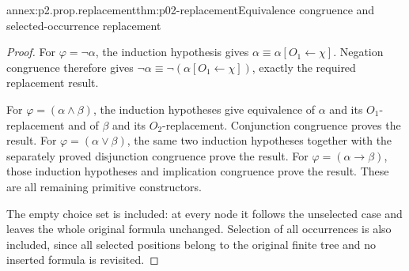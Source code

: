 \begin{annexitem}{annex:p2.prop.replacement}{thm:p02-replacement}{Equivalence congruence and selected-occurrence replacement}
\begin{proof}
For \(\varphi=\neg\alpha\), the induction hypothesis gives
\(\alpha\equiv\alpha[O_1\leftarrow\chi]\).
Negation congruence therefore gives
\(\neg\alpha\equiv\neg(\alpha[O_1\leftarrow\chi])\), exactly the required
replacement result.

For \(\varphi=(\alpha\land\beta)\), the induction hypotheses give equivalence
of \(\alpha\) and its \(O_1\)-replacement and of \(\beta\) and its
\(O_2\)-replacement.  Conjunction congruence proves the result.
For \(\varphi=(\alpha\lor\beta)\), the same two induction hypotheses together
with the separately proved disjunction congruence prove the result.
For \(\varphi=(\alpha\to\beta)\), those induction hypotheses and implication
congruence prove the result.  These are all remaining primitive constructors.

The empty choice set is included: at every node it follows the unselected
case and leaves the whole original formula unchanged.  Selection of all
occurrences is also included, since all selected positions belong to the
original finite tree and no inserted formula is revisited.
\end{proof}
\end{annexitem}
